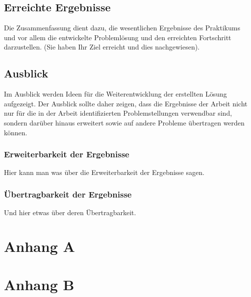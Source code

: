 \documentclass[oneside]{ausarbeitung}
\begin{document}
\section{Erreichte Ergebnisse}
\label{sec:ergebnisse}

Die Zusammenfassung dient dazu, die wesentlichen Ergebnisse des
Praktikums und vor allem die entwickelte Problemlösung und den
erreichten Fortschritt darzustellen. (Sie haben Ihr Ziel erreicht und
dies nachgewiesen).

\section{Ausblick}
\label{sec:ausblick}

Im Ausblick werden Ideen für die Weiterentwicklung der erstellten Lösung
aufgezeigt. Der Ausblick sollte daher zeigen, dass die Ergebnisse der
Arbeit nicht nur für die in der Arbeit identifizierten Problemstellungen
verwendbar sind, sondern darüber hinaus erweitert sowie auf andere
Probleme übertragen werden können.

\subsection{Erweiterbarkeit der Ergebnisse}
\label{sub:erweiterbarkeit}

Hier kann man was über die Erweiterbarkeit der Ergebnisse sagen.

\subsection{Übertragbarkeit der Ergebnisse}
\label{sub:uebertragbarkeit}

Und hier etwas über deren Übertragbarkeit.

\appendix

\printbibliography[heading=bibintoc]

\chapter{Anhang A}

\Blindtext
\Blindtext

\chapter{Anhang B}

\Blindtext
\end{document}
